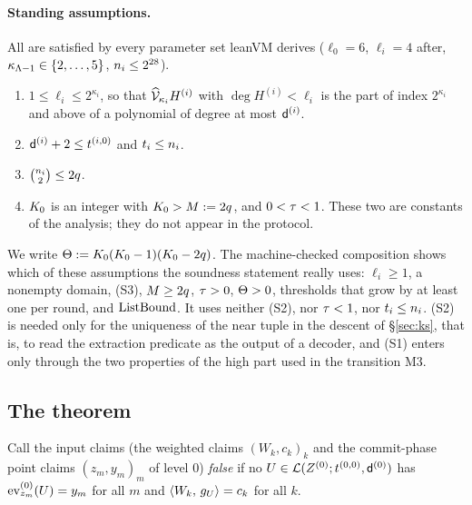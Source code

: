 \paragraph{Standing assumptions.} All are satisfied by every parameter set leanVM derives ($\ell_0=6$, $\ell_i=4$ after, $\kappa_{\Lambda-1}\in\{2,\dots,5\}$, $n_i\le2^{28}$).
\begin{enumerate}[itemsep=1pt,topsep=2pt,label=\textnormal{(S\arabic*)}]
\item $1\le\ell_i\le2^{\kappa_i}$, so that $\widehat{\mathcal{V}}_{\kappa_i}H^{(i)}$ with $\deg H^{(i)}<\ell_i$ is the part of index $2^{\kappa_i}$ and above of a polynomial of degree at most $\mathsf{d}^{(i)}$.
\item $\mathsf{d}^{(i)}+2\le t^{(i,0)}$ and $t_i\le n_i$.
\item $\binom{n_i}{2}\le2q$.
\item $K_0$ is an integer with $K_0>M:=2q$, and $0<\tau<1$. These two are constants of the analysis; they do not appear in the protocol.
\end{enumerate}
We write $\Theta:=K_0(K_0-1)(K_0-2q)$. The machine-checked composition shows which of these assumptions the soundness statement really uses: $\ell_i\ge1$, a nonempty domain, (S3), $M\ge2q$, $\tau>0$, $\Theta>0$, thresholds that grow by at least one per round, and $\mathrm{ListBound}$. It uses neither (S2), nor $\tau<1$, nor $t_i\le n_i$. (S2) is needed only for the uniqueness of the near tuple in the descent of \S\ref{sec:ks}, that is, to read the extraction predicate as the output of a decoder, and (S1) enters only through the two properties of the high part used in the transition M3.

\subsection{The theorem}\label{sec:thm}

Call the input claims (the weighted claims $(W_k,c_k)_k$ and the commit-phase point claims $(z_m,y_m)_m$ of level $0$) \emph{false} if no $U\in\mathcal{L}(Z^{(0)};t^{(0,0)},\mathsf{d}^{(0)})$ has $\operatorname{ev}^{(0)}_{z_m}(U)=y_m$ for all $m$ and $\langle W_k,\, g_U \rangle=c_k$ for all $k$.

